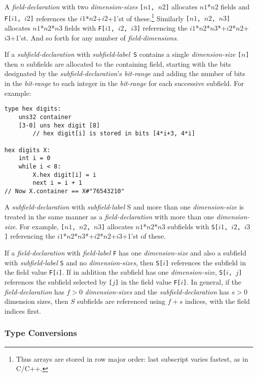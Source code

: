 \documentclass[12pt]{article}
\newcommand{\EOL}{\penalty \exhyphenpenalty}
\newenvironment{indpar}[1][0.3in]%
	{\begin{list}{}%
		     {\setlength{\itemsep}{0in}%
		      \setlength{\topsep}{0in}%
		      \setlength{\parsep}{1ex}%
		      \setlength{\labelwidth}{#1}%
		      \setlength{\leftmargin}{#1}%
		      \addtolength{\leftmargin}{\labelsep}}%
	 \item}%
	{\end{list}}
\begin{document}
A {\em field-declaration} with two {\em dimension-sizes}
{\tt [$n1$, $n2$]} allocates $n1$*$n2$ fields and
{\tt F[$i1$, $i2$]} references the $i1$*$n2$+$i2$+1'st
of these.\footnote{Thus arrays are stored in
row major order: last subscript varies fastest, as in C/C++.}
Similarly
{\tt [$n1$, $n2$, $n3$]} allocates $n1$*$n2$*$n3$ fields with
{\tt F[$i1$, $i2$, $i3$]} referencing the
$i1$*$n2$*$n3$*+$i2$*$n2$+$i3$+1'st.  And so forth for any
number of {\em field-dimensions}.

If a {\em subfield-declaration} with {\em subfield-label}\, {\tt S} contains
a single {\em dimension-size} {\tt [$n$]} then $n$ subfields are
allocated to the containing field, starting with the bits
designated by the {\em subfield-declaration}'s {\em bit-range}
and adding the number of bits in the {\em bit-range} to each integer
in the {\em bit-range} for each successive subfield.
For example:

\begin{indpar}\begin{verbatim}
type hex digits:
    uns32 container
    [3-0] uns hex digit [8]
        // hex digit[i] is stored in bits [4*i+3, 4*i]

hex digits X:
    int i = 0
    while i < 8:
        X.hex digit[i] = i
        next i = i + 1
// Now X.container == X#"76543210"
\end{verbatim}\end{indpar}

A {\em subfield-declaration} with {\em subfield-label} S
and more than one {\em dimension-size} is
treated in the same manner as a {\em field-declaration} with
more than one {\em dimension-size}.  For example,
{\tt [$n1$, $n2$, $n3$]} allocates $n1$*$n2$*$n3$ subfields with
{\tt S[$i1$, $i2$, $i3$]} referencing the
$i1$*$n2$*$n3$*+\EOL $i2$*$n2$+\EOL $i3$+1'st of these.

If a {\em field-declaration} with {\em field-label} {\tt F}
has one {\em dimension-size}
and also a subfield with {\em subfield-label} {\tt S} and no
{\em dimension-sizes}, then
{\tt S[$i$]} references the subfield in the field value {\tt F[$i$]}.
If in addition the subfield has one {\em dimension-size},
{\tt S[$i$, $j$]} references the subfield selected by {\tt [$j$]}
in the field value {\tt F[$i$]}.
In general, if the {\em field-declaration} has $f>0$ {\em dimension-sizes}
and the {\em subfield-declaration} has $s>0$ dimension sizes,
then $S$ subfields are referenced using $f+s$ indices, with the
field indices first.

\subsubsection{Type Conversions}
\label{TYPE-CONVERSIONS}
\end{document}
